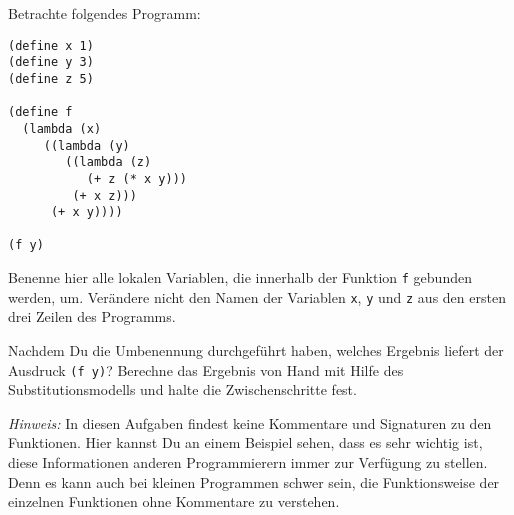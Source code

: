 \begin{aufgabe}
  Betrachte folgendes Programm:

\begin{verbatim}
(define x 1)
(define y 3)
(define z 5)

(define f
  (lambda (x)   
     ((lambda (y)
        ((lambda (z)
           (+ z (* x y)))
         (+ x z)))
      (+ x y))))

(f y)
\end{verbatim}

  Benenne hier alle lokalen Variablen, die innerhalb der Funktion
  \verb"f" gebunden werden, um. Verändere nicht den Namen der
  Variablen \verb"x", \verb"y" und \verb"z" aus den ersten drei Zeilen
  des Programms.

  Nachdem Du die Umbenennung durchgeführt haben, welches Ergebnis liefert
  der Ausdruck \verb"(f y)"? Berechne das Ergebnis von Hand mit Hilfe
  des Substitutionsmodells und halte die Zwischenschritte fest.

  \noindent \emph{Hinweis:} In diesen Aufgaben findest keine
  Kommentare und Signaturen zu den Funktionen. Hier kannst Du an einem
  Beispiel sehen, dass es sehr wichtig ist, diese Informationen
  anderen Programmierern immer zur Verfügung zu stellen. Denn es kann
  auch bei kleinen Programmen schwer sein, die Funktionsweise der
  einzelnen Funktionen ohne Kommentare zu verstehen.
\end{aufgabe}

